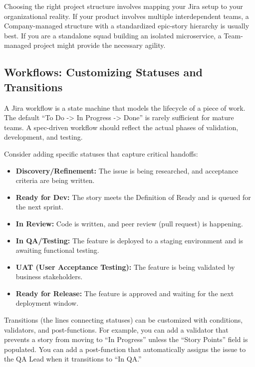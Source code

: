 Choosing the right project structure involves mapping your Jira setup to
your organizational reality. If your product involves multiple
interdependent teams, a Company-managed structure with a standardized
epic-story hierarchy is usually best. If you are a standalone squad
building an isolated microservice, a Team-managed project might provide
the necessary agility.

\subsection{Workflows: Customizing Statuses and
Transitions}\label{workflows-customizing-statuses-and-transitions}

A Jira workflow is a state machine that models the lifecycle of a piece
of work. The default ``To Do -\textgreater{} In Progress -\textgreater{}
Done'' is rarely sufficient for mature teams. A spec-driven workflow
should reflect the actual phases of validation, development, and
testing.

Consider adding specific statuses that capture critical handoffs:

\begin{itemize}
\tightlist
\item
  \textbf{Discovery/Refinement:} The issue is being researched, and
  acceptance criteria are being written.
\item
  \textbf{Ready for Dev:} The story meets the Definition of Ready and is
  queued for the next sprint.
\item
  \textbf{In Review:} Code is written, and peer review (pull request) is
  happening.
\item
  \textbf{In QA/Testing:} The feature is deployed to a staging
  environment and is awaiting functional testing.
\item
  \textbf{UAT (User Acceptance Testing):} The feature is being validated
  by business stakeholders.
\item
  \textbf{Ready for Release:} The feature is approved and waiting for
  the next deployment window.
\end{itemize}

Transitions (the lines connecting statuses) can be customized with
conditions, validators, and post-functions. For example, you can add a
validator that prevents a story from moving to ``In Progress'' unless
the ``Story Points'' field is populated. You can add a post-function
that automatically assigns the issue to the QA Lead when it transitions
to ``In QA.''

